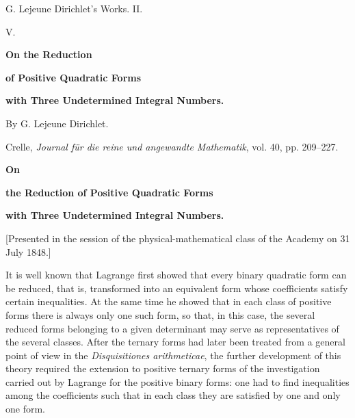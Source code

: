 \documentclass[11pt]{article}
\begin{document}
\begin{center}
{\Large G. Lejeune Dirichlet's Works. II.}\par\vspace{1.2em}
{\Large V.}\par\vspace{0.5em}
{\LARGE \textbf{On the Reduction}}\par
{\LARGE \textbf{of Positive Quadratic Forms}}\par
{\LARGE \textbf{with Three Undetermined Integral Numbers.}}\par\vspace{1em}
{\large By G. Lejeune Dirichlet.}\par\vspace{0.5em}
{\small Crelle, \emph{Journal für die reine und angewandte Mathematik}, vol. 40, pp. 209--227.}
\end{center}

\begin{center}
\textbf{On}\par
\textbf{the Reduction of Positive Quadratic Forms}\par
\textbf{with Three Undetermined Integral Numbers.}\par
{\small [Presented in the session of the physical-mathematical class of the Academy on 31 July 1848\footnotemark.]}
\end{center}

It is well known that Lagrange first showed that every binary quadratic form can be reduced, that is, transformed into an equivalent form whose coefficients satisfy certain inequalities. At the same time he showed that in each class of positive forms there is always only one such form, so that, in this case, the several reduced forms belonging to a given determinant may serve as representatives of the several classes. After the ternary forms had later been treated from a general point of view in the \emph{Disquisitiones arithmeticae}, the further development of this theory required the extension to positive ternary forms of the investigation carried out by Lagrange for the positive binary forms: one had to find inequalities among the coefficients such that in each class they are satisfied by one and only one form.
\end{document}
